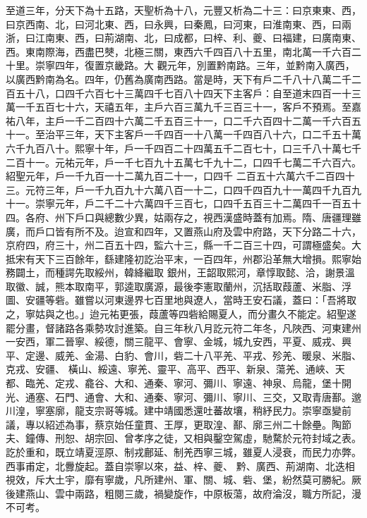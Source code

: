 \begin{pinyinscope}
 至道三年，分天下為十五路，天聖析為十八，元豐又析為二十三：曰京東東、西，曰京西南、北，曰河北東、西，曰永興，曰秦鳳，曰河東，曰淮南東、西，曰兩浙，曰江南東、西，曰荊湖南、北，曰成都，曰梓、利、夔、曰福建，曰廣南東、西。東南際海，西盡巴僰，北極三關，東西六千四百八十五里，南北萬一千六百二十里。崇寧四年，復置京畿路。大
 觀元年，別置黔南路。三年，並黔南入廣西，以廣西黔南為名。四年，仍舊為廣南西路。當是時，天下有戶二千八十八萬二千二百五十八，口四千六百七十三萬四千七百八十四天下主客戶：自至道末四百一十三萬一千五百七十六，天禧五年，主戶六百三萬九千三百三十一，客戶不預焉。至嘉祐八年，主戶一千二百四十六萬二千五百三十一，口二千六百四十二萬一千六百五十一。至治平三年，天下主客戶一千四百一十八萬一千四百八十六，口二千五十萬六千九百八十。熙寧十年，戶一千四百二十四萬五千二百七十，口三千八十萬七千二百十一。元祐元年，戶一千七百九十五萬七千九十二，口四千七萬二千六百六。紹聖元年，戶一千九百一十二萬九百二十一，口四千
 二百五十六萬六千二百四十三。元符三年，戶一千九百九十六萬八百一十二，口四千四百九十一萬四千九百九十一。崇寧元年，戶二千二十六萬四千三百七，口四千五百三十二萬四千一百五十四。各府、州下戶口與總數少異，姑兩存之，視西漢盛時蓋有加焉。隋、唐疆理雖廣，而戶口皆有所不及。迨宣和四年，又置燕山府及雲中府路，天下分路二十六，京府四，府三十，州二百五十四，監六十三，縣一千二百三十四，可謂極盛矣。大抵宋有天下三百餘年，繇建隆初訖治平末，一百四年，州郡沿革無大增損。熙寧始務闢土，而種諤先取綏州，韓絳繼取
 銀州，王韶取熙河，章惇取懿、洽，謝景溫取徽、誠，熊本取南平，郭逵取廣源，最後李憲取蘭州，沉括取葭蘆、米脂、浮圖、安疆等砦。雖嘗以河東邊界七百里地與遼人，當時王安石議，蓋曰：「吾將取之，寧姑與之也。」迨元祐更張，葭蘆等四砦給賜夏人，而分畫久不能定。紹聖遂罷分畫，督諸路各乘勢攻討進築。自三年秋八月訖元符二年冬，凡陜西、河東建州一安西，軍二晉寧、綏德，關三龍平、會寧、金城，城九安西，平夏、威戎、興平、定邊、威羌、金湯、白豹、會川，砦二十八平羌、平戎、殄羌、暖泉、米脂、克戎、安疆、
 橫山、綏遠、寧羌、靈平、高平、西平、新泉、蕩羌、通峽、天都、臨羌、定戎、龕谷、大和、通秦、寧河、彌川、寧遠、神泉、烏龍，堡十開光、通塞、石門、通會、大和、通秦、寧河、彌川、寧川、三交，又取青唐鄯。邈川湟，寧塞廓，龍支宗哥等城。建中靖國悉還吐蕃故壤，稍紓民力。崇寧亟變前議，專以紹述為事，蔡京始任童貫、王厚，更取湟、鄯、廓三州二十餘壘。陶節夫、鐘傳、刑恕、胡宗回、曾孝序之徒，又相與鑿空駕虛，馳騖於元符封域之表。訖於重和，既立靖夏涇原、制戎鄜延、制羌西寧三城，雖夏人浸衰，而民力亦弊。西事甫定，北釁旋起。蓋自崇寧以來，益、梓、夔、
 黔、廣西、荊湖南、北迭相視效，斥大土宇，靡有寧歲，凡所建州、軍、關、城、砦、堡，紛然莫可勝紀。厥後建燕山、雲中兩路，粗閱三歲，禍變旋作，中原板蕩，故府淪沒，職方所記，漫不可考。




\end{pinyinscope}
